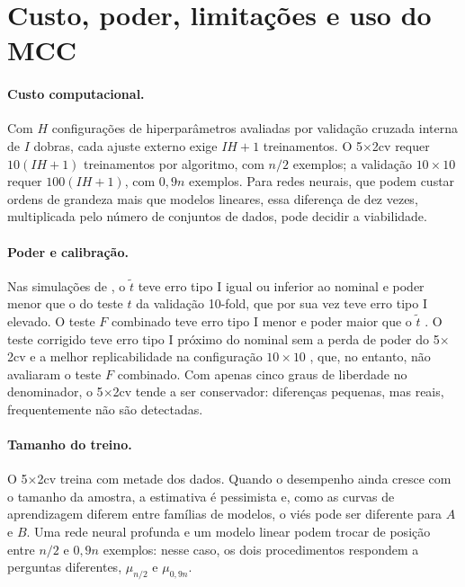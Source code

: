 \documentclass[11pt,a4paper]{article}
\begin{document}
\section{Custo, poder, limitações e uso do MCC}\label{sec:custo}

\paragraph{Custo computacional.}
Com $H$ configurações de hiperparâmetros avaliadas por validação cruzada
interna de $I$ dobras, cada ajuste externo exige $IH+1$ treinamentos. O
5$\times$2cv requer $10(IH+1)$ treinamentos por algoritmo, com $n/2$ exemplos;
a validação $10\times10$ requer $100(IH+1)$, com $0{,}9n$ exemplos. Para redes
neurais, que podem custar ordens de grandeza mais que modelos lineares, essa
diferença de dez vezes, multiplicada pelo número de conjuntos de dados, pode
decidir a viabilidade.

\paragraph{Poder e calibração.}
Nas simulações de \citet{dietterich1998approximate}, o $\tilde t$ teve erro
tipo I igual ou inferior ao nominal e poder menor que o do teste $t$ da
validação 10-fold, que por sua vez teve erro tipo I elevado. O teste $F$
combinado teve erro tipo I menor e poder maior que o $\tilde t$
\citep{alpaydin1999combined}. O teste corrigido teve erro tipo I próximo do
nominal sem a perda de poder do 5$\times$2cv \citep{nadeau2003inference} e
a melhor replicabilidade na configuração $10\times10$
\citep{bouckaert2004replicability}, que, no entanto, não avaliaram o teste $F$
combinado. Com apenas cinco graus de liberdade no denominador, o 5$\times$2cv
tende a ser conservador: diferenças pequenas, mas reais, frequentemente não
são detectadas.

\paragraph{Tamanho do treino.}
O 5$\times$2cv treina com metade dos dados. Quando o desempenho ainda cresce
com o tamanho da amostra, a estimativa é pessimista \citep{efron1997improvements}
e, como as curvas de aprendizagem diferem entre famílias de modelos, o viés
pode ser diferente para $A$ e $B$. Uma rede neural profunda e um modelo linear
podem trocar de posição entre $n/2$ e $0{,}9n$ exemplos: nesse caso, os dois
procedimentos respondem a perguntas diferentes, $\mu_{n/2}$ e $\mu_{0{,}9n}$.
\end{document}

